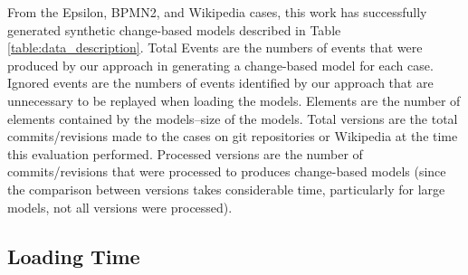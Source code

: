 \documentclass{llncs}
\begin{document}
From the Epsilon, BPMN2, and Wikipedia cases, this work has successfully generated synthetic change-based models described in Table \ref{table:data_description}. Total Events are the numbers of events that were produced by our approach in generating a change-based model for each case. Ignored events are the numbers of events identified by our approach that are unnecessary to be replayed when loading the models. Elements are the number of elements contained by the models--size of the models. Total versions are the total commits/revisions made to the cases on git repositories or Wikipedia at the time this evaluation performed. Processed versions are the number of commits/revisions that were processed to produces change-based models (since the comparison between versions takes considerable time, particularly for large models, not all versions were processed). 

\subsection{Loading Time}
\label{subsec:loading_time_test}
\end{document}
